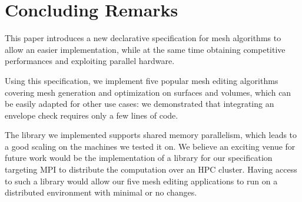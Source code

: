 \section{Concluding Remarks}

This paper introduces a new declarative specification for mesh algorithms to allow an easier implementation, while at the same time obtaining competitive performances and exploiting parallel hardware. 

Using this specification, we implement {five} popular mesh editing algorithms covering mesh generation and optimization on surfaces and volumes, which can be easily adapted for other use cases: we demonstrated that integrating an envelope check {requires} only a few lines of code.

The library we implemented supports shared memory parallelism, which leads to a good scaling on the machines we tested it on. We believe an exciting venue for future work would be the implementation of a library {for} our specification targeting  MPI to distribute the computation over an HPC cluster. Having access to such a library would allow our five mesh editing applications to run on a distributed environment with minimal or no changes.



